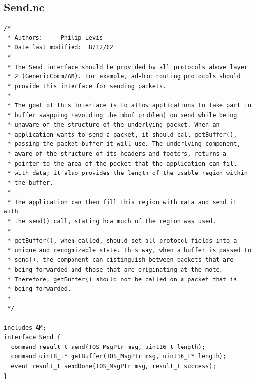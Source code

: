 \documentclass[10pt]{article}
\begin{document}
\subsection*{Send.nc}
\scriptsize
\begin{verbatim}
/*
 * Authors:		Philip Levis
 * Date last modified:  8/12/02
 *
 * The Send interface should be provided by all protocols above layer
 * 2 (GenericComm/AM). For example, ad-hoc routing protocols should
 * provide this interface for sending packets.
 *
 * The goal of this interface is to allow applications to take part in
 * buffer swapping (avoiding the mbuf problem) on send while being
 * unaware of the structure of the underlying packet. When an
 * application wants to send a packet, it should call getBuffer(),
 * passing the packet buffer it will use. The underlying component,
 * aware of the structure of its headers and footers, returns a
 * pointer to the area of the packet that the application can fill
 * with data; it also provides the length of the usable region within
 * the buffer.
 *
 * The application can then fill this region with data and send it with
 * the send() call, stating how much of the region was used.
 *
 * getBuffer(), when called, should set all protocol fields into a
 * unique and recognizable state. This way, when a buffer is passed to
 * send(), the component can distinguish between packets that are
 * being forwarded and those that are originating at the mote.
 * Therefore, getBuffer() should not be called on a packet that is
 * being forwarded.
 *
 */

includes AM;
interface Send { 
  command result_t send(TOS_MsgPtr msg, uint16_t length);
  command uint8_t* getBuffer(TOS_MsgPtr msg, uint16_t* length);
  event result_t sendDone(TOS_MsgPtr msg, result_t success);
}
\end{verbatim}
\normalsize
\end{document}
